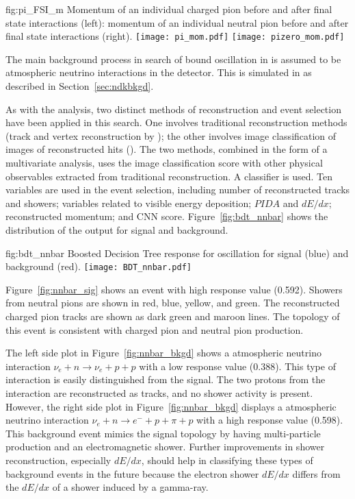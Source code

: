 \begin{dunefigure}
{fig:pi_FSI_m}
{Momentum of an individual charged pion before and after final state interactions (left): momentum of an individual neutral pion before and after final state interactions (right).}
\texttt{[image: pi\_mom.pdf]}
\texttt{[image: pizero\_mom.pdf]}
\end{dunefigure} 

The main background process in search of bound \nnbar oscillation in  is assumed to be atmospheric neutrino interactions in the detector.  This is simulated in  as described in Section~\ref{sec:ndkbkgd}.

As with the \ptoknubar analysis, two distinct methods of reconstruction and event selection have been applied in this search. One involves traditional reconstruction methods (\threed track and vertex reconstruction by ); the other involves image classification 
of \twod images of reconstructed hits (). The two methods, combined in the form of a multivariate analysis, uses the image classification score with other physical observables extracted from traditional reconstruction.  A  classifier is used. Ten variables are used in the  event selection, including number of reconstructed tracks and showers; variables related to visible energy deposition; $PIDA$ and $dE/dx$; reconstructed momentum; and CNN score.  Figure~\ref{fig:bdt_nnbar} shows the distribution of the  output for signal and background.

\begin{dunefigure}
{fig:bdt_nnbar}
{Boosted Decision Tree response for \nnbar oscillation for signal (blue) and background (red).}
\texttt{[image: BDT\_nnbar.pdf]}
\end{dunefigure} 

Figure~\ref{fig:nnbar_sig} shows an \nnbar event with high  response value (\num{0.592}). Showers from neutral pions are shown in red, blue, yellow, and green. The reconstructed charged pion tracks are shown as dark green and maroon lines. The topology of this event is consistent with charged pion and neutral pion production. 

The left side plot in Figure~\ref{fig:nnbar_bkgd} shows a  atmospheric neutrino interaction $\nu_{e}+n\rightarrow \nu_{e}+p+p$ with a low  response value (\num{0.388}). This type of interaction is easily distinguished from the signal.  The two protons from the  interaction are reconstructed as tracks, and no shower activity is present. However, the right side plot in Figure~\ref{fig:nnbar_bkgd} displays a  atmospheric neutrino interaction $\nu_{e}+n\rightarrow {e}^{-}+p+\pi +p$ with a high  response value (\num{0.598}). This background event mimics the signal topology by having multi-particle production and an electromagnetic shower. Further improvements in shower reconstruction, especially $dE/dx$, should help in classifying these types of background events in the future because the electron shower $dE/dx$ differs from the $dE/dx$ of a shower induced by a gamma-ray.

